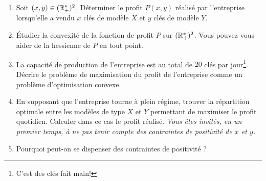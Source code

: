 \documentclass[11pt, a4paper]{article}
\begin{document}
\begin{question}{6}
  \begin{enumerate}
  \item Soit $(x, y) \in (\mathbb{R}_+^*)^2$. Déterminer le profit $P(x, y)$
    réalisé par l’entreprise lorsqu’elle a vendu $x$ clés de modèle $X$
    et $y$ clés de modèle $Y$.
  \item Étudier la convexité de la fonction de profit $P$ sur
    $(\mathbb{R}_+^*)^2$. Vous pouvez vous aider de la hessienne de $P$ en
    tout point.
  \item La capacité de production de l’entreprise est au total de $20$
    clés par jour\footnote{C'est des clés fait main!}. Décrire le
    problème de maximisation du profit de l'entreprise comme un
    problème d'optimisation convexe.
  \item En supposant que l’entreprise tourne à plein régime, trouver
    la répartition optimale entre les modèles de type $X$ et $Y$
    permettant de maximiser le profit quotidien. Calculer dans ce cas
    le profit réalisé. \textit{Vous êtes invités, en un premier temps,
      à ne pas tenir compte des contraintes de positivité de $x$ et
      $y$.}
  \item Pourquoi peut-on se dispenser des contraintes de positivité ?
  \end{enumerate}
\end{question}
\end{document}
